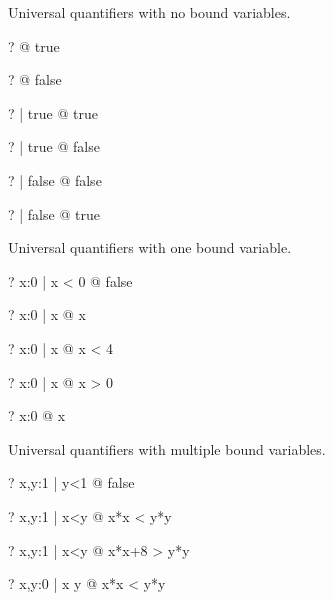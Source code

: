\documentclass{article}
\begin{document}
Universal quantifiers with no bound variables.
\begin{zed} \vdash?       \forall @ true \end{zed}
\begin{zed} \vdash? \lnot \forall @ false \end{zed}
\begin{zed} \vdash?       \forall | true @ true \end{zed}
\begin{zed} \vdash? \lnot \forall | true @ false \end{zed}
\begin{zed} \vdash?       \forall | false @ false \end{zed}
\begin{zed} \vdash?       \forall | false @ true \end{zed}

Universal quantifiers with one bound variable.
\begin{zed} \vdash?       \forall x:0  | x < 0 @ false \end{zed}  %
\begin{zed} \vdash?       \forall x:0  | x  @ x   \end{zed}
\begin{zed} \vdash? \lnot \forall x:0  | x  @ x < 4 \end{zed}
\begin{zed} \vdash? \lnot \forall x:0  | x  @ x > 0 \end{zed}
\begin{zed} \vdash? \lnot \forall x:0  @ x  \end{zed}

Universal quantifiers with multiple bound variables.
\begin{zed} \vdash?       \forall x,y:1  | y<1 @ false \end{zed} %
\begin{zed} \vdash?       \forall x,y:1  | x<y @ x*x < y*y \end{zed}
\begin{zed} \vdash? \lnot \forall x,y:1  | x<y @ x*x+8 > y*y \end{zed}
\begin{zed} \vdash? \lnot \forall x,y:0  | x \leq y @ x*x < y*y \end{zed}
\end{document}
